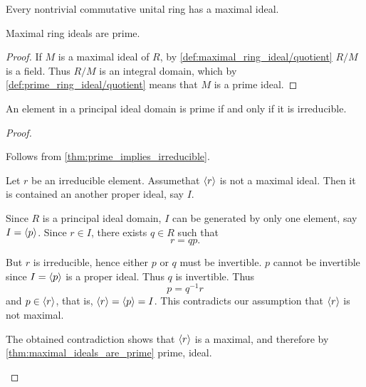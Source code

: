 \begin{theorem}\label{thm:krulls_theorem}\cite{Hodges1979}
  Every nontrivial commutative unital ring has a maximal ideal.
\end{theorem}

\begin{proposition}\label{thm:maximal_ideals_are_prime}
  Maximal ring ideals are prime.
\end{proposition}
\begin{proof}
  If \( M \) is a maximal ideal of \( R \), by \cref{def:maximal_ring_ideal/quotient} \( R / M \) is a field. Thus \( R / M \) is an integral domain, which by \cref{def:prime_ring_ideal/quotient} means that \( M \) is a prime ideal.
\end{proof}

\begin{proposition}\label{thm:pid_prime_iff_irreducible}
  An element in a principal ideal domain is prime if and only if it is irreducible.
\end{proposition}
\begin{proof}
  \begin{description}
    \Implies Follows from \cref{thm:prime_implies_irreducible}.

    \ImpliedBy Let \( r \) be an irreducible element. Assume\LEM that \( \left\langle r \right\rangle \) is not a maximal ideal. Then it is contained an another proper ideal, say \( I \).

    Since \( R \) is a principal ideal domain, \( I \) can be generated by only one element, say \( I = \left\langle p \right\rangle \). Since \( r \in I \), there exists \( q \in R \) such that
    \begin{equation*}
      r = qp.
    \end{equation*}

    But \( r \) is irreducible, hence either \( p \) or \( q \) must be invertible. \( p \) cannot be invertible since \( I = \left\langle p \right\rangle \) is a proper ideal. Thus \( q \) is invertible. Thus
    \begin{equation*}
      p = q^{-1} r
    \end{equation*}
    and \( p \in \left\langle r \right\rangle \), that is, \( \left\langle r \right\rangle = \left\langle p \right\rangle = I \). This contradicts our assumption that \( \left\langle r \right\rangle \) is not maximal.

    The obtained contradiction shows that \( \left\langle r \right\rangle \) is a maximal, and therefore by \cref{thm:maximal_ideals_are_prime} prime, ideal.
  \end{description}
\end{proof}

